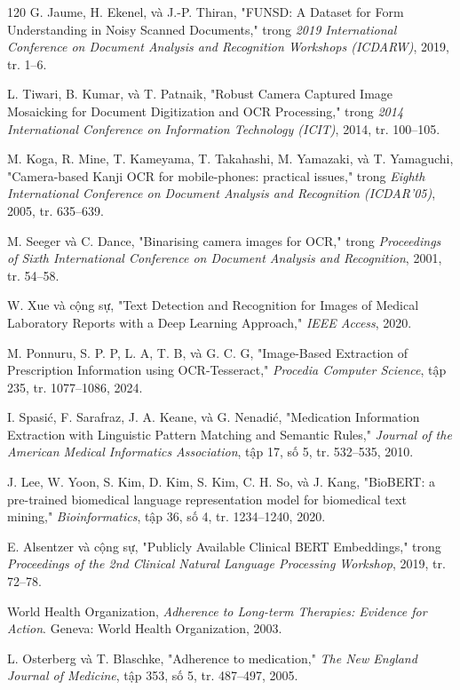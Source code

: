\documentclass[12pt,a4paper]{report}
\begin{document}
\begin{thebibliography}{120}
G. Jaume, H. Ekenel, và J.-P. Thiran, "FUNSD: A Dataset for Form Understanding in Noisy Scanned Documents," trong \textit{2019 International Conference on Document Analysis and Recognition Workshops (ICDARW)}, 2019, tr. 1--6.

L. Tiwari, B. Kumar, và T. Patnaik, "Robust Camera Captured Image Mosaicking for Document Digitization and OCR Processing," trong \textit{2014 International Conference on Information Technology (ICIT)}, 2014, tr. 100--105.

M. Koga, R. Mine, T. Kameyama, T. Takahashi, M. Yamazaki, và T. Yamaguchi, "Camera-based Kanji OCR for mobile-phones: practical issues," trong \textit{Eighth International Conference on Document Analysis and Recognition (ICDAR'05)}, 2005, tr. 635--639.

M. Seeger và C. Dance, "Binarising camera images for OCR," trong \textit{Proceedings of Sixth International Conference on Document Analysis and Recognition}, 2001, tr. 54--58.

W. Xue và cộng sự, "Text Detection and Recognition for Images of Medical Laboratory Reports with a Deep Learning Approach," \textit{IEEE Access}, 2020.

M. Ponnuru, S. P. P, L. A, T. B, và G. C. G, "Image-Based Extraction of Prescription Information using OCR-Tesseract," \textit{Procedia Computer Science}, tập 235, tr. 1077--1086, 2024.

I. Spasi\'c, F. Sarafraz, J. A. Keane, và G. Nenadi\'c, "Medication Information Extraction with Linguistic Pattern Matching and Semantic Rules," \textit{Journal of the American Medical Informatics Association}, tập 17, số 5, tr. 532--535, 2010.

J. Lee, W. Yoon, S. Kim, D. Kim, S. Kim, C. H. So, và J. Kang, "BioBERT: a pre-trained biomedical language representation model for biomedical text mining," \textit{Bioinformatics}, tập 36, số 4, tr. 1234--1240, 2020.

E. Alsentzer và cộng sự, "Publicly Available Clinical BERT Embeddings," trong \textit{Proceedings of the 2nd Clinical Natural Language Processing Workshop}, 2019, tr. 72--78.

World Health Organization, \textit{Adherence to Long-term Therapies: Evidence for Action}. Geneva: World Health Organization, 2003.

L. Osterberg và T. Blaschke, "Adherence to medication," \textit{The New England Journal of Medicine}, tập 353, số 5, tr. 487--497, 2005.

\end{thebibliography}
\endgroup
\end{document}
